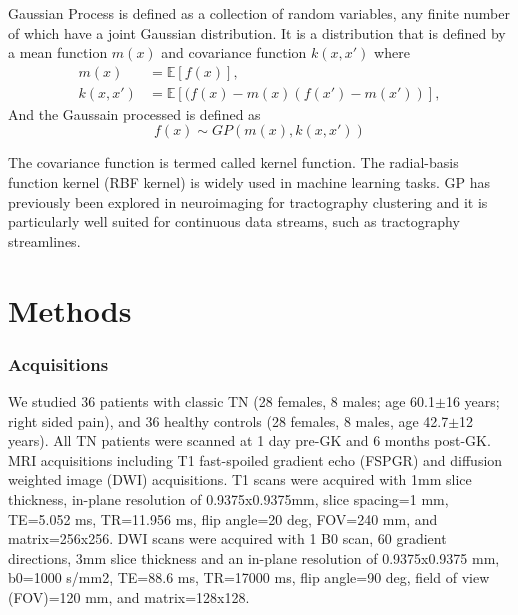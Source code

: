 Gaussian Process is defined \cite{rasmussen2006gaussian} as a collection of random variables, any finite number of which have a joint Gaussian distribution. 
It is a distribution that is defined by a mean function $m(x)$ and covariance function $k(x,x') $ where
\begin{equation}
	\begin{split}
		m(x) &= \mathbb{E}[f(x)], \\
		k(x,x') &= \mathbb{E}[(f(x)-m(x)(f(x')-m(x'))],
	\end{split}
\end{equation}
And the Gaussain processed is defined as
\begin{equation}
f(x) \sim GP(m(x), k(x, x')) 
\end{equation}

The covariance function is termed called kernel function. The radial-basis function kernel (RBF kernel) is widely used in machine learning tasks. GP has previously been explored in neuroimaging for tractography clustering \cite{Wassermann2010} and it is particularly well suited for continuous data streams, such as tractography streamlines. 

\section{Methods}
\subsubsection{Acquisitions}
We studied 36 patients with classic TN (28 females, 8 males; age 60.1$\pm$16 years; right sided pain), and 36 healthy controls (28 females, 8 males, age 42.7$\pm$12 years).  All TN patients were scanned at 1 day pre-GK and 6 months post-GK. MRI acquisitions including T1 fast-spoiled gradient echo (FSPGR) and diffusion weighted image (DWI) acquisitions. T1 scans were acquired with 1mm slice thickness, in-plane resolution of 0.9375x0.9375mm, slice spacing=1 mm, TE=5.052 ms, TR=11.956 ms, flip angle=20 deg, FOV=240 mm, and matrix=256x256. DWI scans were acquired with 1 B0 scan, 60 gradient directions, 3mm slice thickness and an in-plane resolution of 0.9375x0.9375 mm, b0=1000 s/mm2, TE=88.6 ms, TR=17000 ms, flip angle=90 deg, field of view (FOV)=120 mm, and matrix=128x128.


